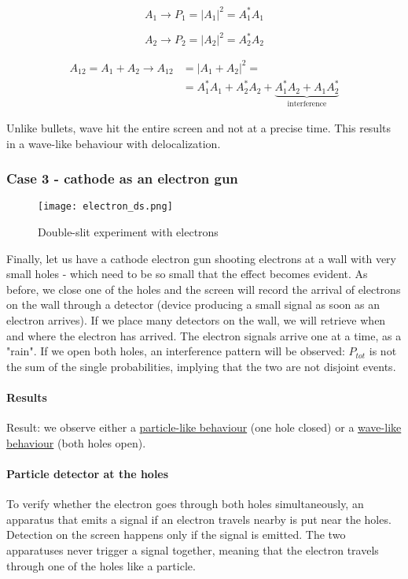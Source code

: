         $$A_1\rightarrow P_1 = |A_1|^2 = A_1^*A_1$$

        $$A_2\rightarrow P_2 = |A_2|^2 = A_2^*A_2$$

        \begin{align*}
          A_{12} = A_1+A_2\rightarrow A_{12} &= |A_1+A_2|^2=\\
                                            &=A_1^*A_1 + A_2^*A_2 + \underbrace{A_1^*A_2 + A_1A_2^*}_{\text{interference}}
        \end{align*}

        Unlike bullets, wave hit the entire screen and not at a precise time.
        This results in a wave-like behaviour with delocalization.

    \subsubsection{Case 3 - cathode as an electron gun}

    \begin{figure}[h!]
      \centering
      \texttt{[image: electron\_ds.png]}
      \caption{\label{fig:electron_ds} Double-slit experiment with electrons}
    \end{figure}

    Finally, let us have a cathode electron gun shooting electrons at a wall with very small holes - which need to be so small that the effect becomes evident.
    As before, we close one of the holes and the screen will record the arrival of electrons on the wall through a detector (device producing a small signal as soon as an electron arrives).
    If we place many detectors on the wall, we will retrieve when and where the electron has arrived.
    The electron signals arrive one at a time, as a "rain".
    If we open both holes, an interference pattern will be observed: $P_{tot}$ is not the sum of the single probabilities, implying that the two are not disjoint events.

      \paragraph{Results}
      Result: we observe either a \underline{particle-like behaviour} (one hole closed) or a \underline{wave-like behaviour} (both holes open).

      \paragraph{Particle detector at the holes}
      To verify whether the electron goes through both holes simultaneously, an apparatus that emits a signal if an electron travels nearby is put near the holes.
      Detection on the screen happens only if the signal is emitted.
      The two apparatuses never trigger a signal together, meaning that the electron travels through one of the holes like a particle.

